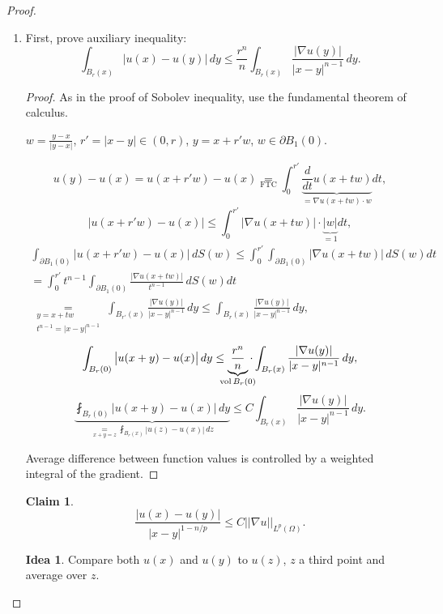 \documentclass[12pt]{article}
\DeclareMathOperator{\vol}{vol}
\theoremstyle{definition}
\newtheorem*{claim*}{Claim}
\newtheorem*{idea}{Idea}
\begin{document}
\begin{proof}
\begin{enumerate}[label=\alph*)]
\item First, prove auxiliary inequality:
\begin{equation}\tag{A}\label{auxiliary}
\int_{B_r(x)}\big|u(x)-u(y)\big|\,dy\leq\frac{r^n}{n}\int_{B_r(x)}\frac{|\nabla u(y)|}{|x-y|^{n-1}}\,dy.
\end{equation}

\begin{proof}
As in the proof of Sobolev inequality, use the fundamental theorem of calculus.

$w=\frac{y-x}{|y-x|}$, $r'=|x-y|\in(0,r)$, $y=x+r'w$, $w\in\partial B_1(0)$.

\[u(y)-u(x)=u(x+r'w)-u(x)\underset{\text{FTC}}{=}\int_0^{r'}\underbrace{\frac{d}{dt}u(x+tw)}_{=\nabla u(x+tw)\cdot w}dt,\]
\[\big|u(x+r'w)-u(x)\big|\leq\int_0^{r'}\big|\nabla u(x+tw)\big|\cdot\underbrace{|w|}_{=1}dt,\]
\begin{multline*}
\int_{\partial B_1(0)}\big|u(x+r'w)-u(x)\big|\,dS(w)\leq\int_0^{r'}\int_{\partial B_1(0)}\big|\nabla u(x+tw)\big|\,dS(w)dt\\
=\int_0^{r'}t^{n-1}\int_{\partial B_1(0)}\frac{\big|\nabla u(x+tw)\big|}{t^{n-1}}\,dS(w)dt\\
\underset{\substack{y=x+tw\\t^{n-1}=|x-y|^{n-1}}}{=}\int_{B_{r'}(x)}\frac{|\nabla u(y)|}{|x-y|^{n-1}}\,dy\leq\int_{B_r(x)}\frac{|\nabla u(y)|}{|x-y|^{n-1}}\,dy,
\end{multline*}
\[\int_{B_r(0)}\big|u(x+y)-u(x)\big|\,dy\leq\underbrace{\frac{r^n}{n}}_{\mathclap{\vol B_r(0)}}\cdot\int_{B_r(x)}\frac{|\nabla u(y)|}{|x-y|^{n-1}}\,dy,\]
\begin{equation}\tag{A$'$}\label{auxiliary_average}
\underbrace{\fint_{B_r(0)}\big|u(x+y)-u(x)\big|\,dy}_{\underset{x+y=z}{=}\fint_{B_r(x)}|u(z)-u(x)|\,dz}\leq C\int_{B_r(x)}\frac{|\nabla u(y)|}{|x-y|^{n-1}}\,dy.
\end{equation}

Average difference between function values is controlled by a weighted integral of the gradient.
\end{proof}

\begin{claim*}
\[\frac{\big|u(x)-u(y)\big|}{|x-y|^{1-n/p}}\leq C||\nabla u||_{L^p(\Omega)}.\]
\end{claim*}

\begin{idea}
Compare both $u(x)$ and $u(y)$ to $u(z)$, $z$ a third point and average over $z$.
\end{idea}


\end{enumerate}
\end{proof}
\end{document}
